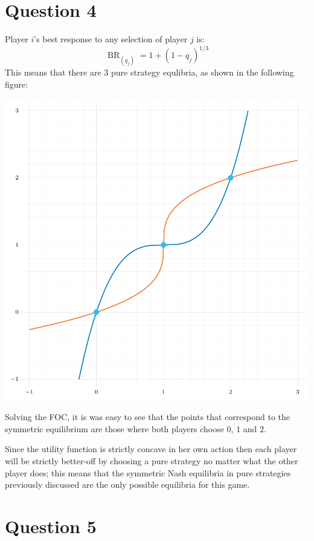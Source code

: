 \documentclass{article}
\theoremstyle{definition}
\begin{document}
\section*{Question 4}

Player $i$'s best response to any selection of player $j$ is:
$$\operatorname{BR}_(q_j) = 1 + (1-q_j)^{1/3}$$
This means that there are 3 pure strategy equlibria, as shown in the following figure:

\begin{center}
    \includegraphics[scale=.4]{fig_ps2.pdf}   
\end{center}

Solving the FOC, it is was easy to see that the points that correspond to the symmetric equilibrium are those where both players choose $0$, $1$ and $2$.

Since the utility function is strictly concave in her own action then each player will be strictly better-off by choosing a pure strategy no matter what the other player does; this means that the symmetric Nash equilibria in pure strategies previously discussed are the only possible equilibria for this game.

\section*{Question 5}
\end{document}
